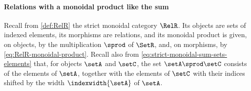 \paragraph{Relations with a monoidal product like the sum}
\label{sec:feedback-RelR}

Recall from \cref{def:RelR} the strict monoidal category $\RelR$.
Its objects are sets of indexed elements, its morphisms are relations, and its monoidal product is given, on objects, by the multiplication $\sprod$ of $\SetR$, and, on morphisms, by \cref{eq:RelR-monoidal-product}.
Recall also from \cref{eq:strict-monoidal-sum-sets-elements} that, for objects $\setA$ and $\setC$, the set $\setA \sprod \setC$ consists of the elements of $\setA$, together with the elements of $\setC$ with their indices shifted by the width $\indexwidth{\setA}$ of $\setA$.

